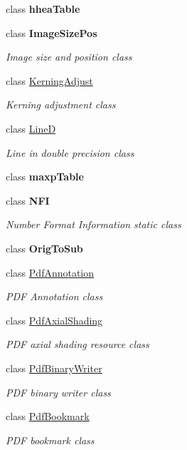 \begin{DoxyCompactItemize}
class {\bfseries hhea\+Table}
\item 
class {\bfseries Image\+Size\+Pos}
\begin{DoxyCompactList}\small\item\em Image size and position class \end{DoxyCompactList}\item 
class \hyperlink{class_pdf_file_writer_1_1_kerning_adjust}{Kerning\+Adjust}
\begin{DoxyCompactList}\small\item\em Kerning adjustment class \end{DoxyCompactList}\item 
class \hyperlink{class_pdf_file_writer_1_1_line_d}{LineD}
\begin{DoxyCompactList}\small\item\em Line in double precision class \end{DoxyCompactList}\item 
class {\bfseries maxp\+Table}
\item 
class {\bfseries N\+FI}
\begin{DoxyCompactList}\small\item\em Number Format Information static class \end{DoxyCompactList}\item 
class {\bfseries Orig\+To\+Sub}
\item 
class \hyperlink{class_pdf_file_writer_1_1_pdf_annotation}{Pdf\+Annotation}
\begin{DoxyCompactList}\small\item\em P\+DF Annotation class \end{DoxyCompactList}\item 
class \hyperlink{class_pdf_file_writer_1_1_pdf_axial_shading}{Pdf\+Axial\+Shading}
\begin{DoxyCompactList}\small\item\em P\+DF axial shading resource class \end{DoxyCompactList}\item 
class \hyperlink{class_pdf_file_writer_1_1_pdf_binary_writer}{Pdf\+Binary\+Writer}
\begin{DoxyCompactList}\small\item\em P\+DF binary writer class \end{DoxyCompactList}\item 
class \hyperlink{class_pdf_file_writer_1_1_pdf_bookmark}{Pdf\+Bookmark}
\begin{DoxyCompactList}\small\item\em P\+DF bookmark class \end{DoxyCompactList}\item 

\end{DoxyCompactItemize}
